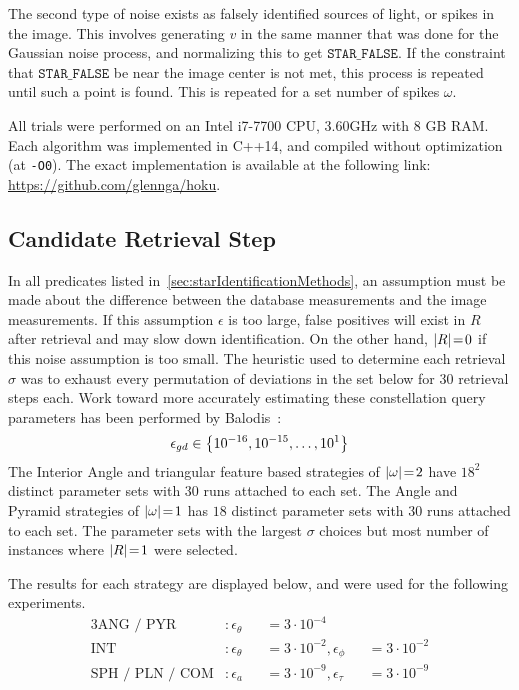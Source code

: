 The second type of noise exists as falsely identified sources of light, or spikes in the image.
This involves generating $v$ in the same manner that was done for the Gaussian noise process, and normalizing this to get $\texttt{STAR\_FALSE}$.
If the constraint that $\texttt{STAR\_FALSE}$ be near the image center is not met, this process is repeated until such a point is found.
This is repeated for a set number of spikes $\omega$.

All trials were performed on an Intel i7-7700 CPU, 3.60GHz with 8 GB RAM\@.
Each algorithm was implemented in C++14, and compiled without optimization (at \texttt{-O0}).
The exact implementation is available at the following link: \url{https://github.com/glennga/hoku}.

\subsection{Candidate Retrieval Step}\label{subsec:catalogQueryStep}
In all predicates listed in~\autoref{sec:starIdentificationMethods}, an assumption must be made about the difference between the database measurements and the image measurements.
If this assumption $\epsilon$ is too large, false positives will exist in $R$ after retrieval and may slow down identification.
On the other hand, $\left| R \right| \!=\! 0$ if this noise assumption is too small.
The heuristic used to determine each retrieval $\sigma$ was to exhaust every permutation of deviations in the set below for 30 retrieval steps each.
Work toward more accurately estimating these constellation query parameters has been performed by Balodis~\cite{balodis:parametersAutomated}:
\begin{equation}
    \epsilon_{gd} \in \left\{  10^{-16}, 10^{-15}, \ldots, 10^1  \right\}
\end{equation}
The Interior Angle and triangular feature based strategies of $\left| \omega \right| \!=\! 2$ have $18^2$ distinct parameter sets with 30 runs attached to each set.
The Angle and Pyramid strategies of $\left| \omega \right| \!=\! 1$ has $18$ distinct parameter sets with 30 runs attached to each set.
The parameter sets with the largest $\sigma$ choices but most number of instances where $\left| R \right| \!=\! 1$ were selected.

The results for each strategy are displayed below, and were used for the following experiments.
\begin{alignat*}{3}
    \text{ANG / PYR}&: \epsilon_\theta &&= 3\cdot 10^{-4} &&{}\\
    \text{INT}&: \epsilon_\theta &&= 3\cdot 10^{-2}, \epsilon_\phi &&= 3\cdot 10^{-2} \\
    \text{SPH / PLN / COM}&: \epsilon_a &&= 3 \cdot 10^{-9}, \epsilon_\tau &&= 3 \cdot 10^{-9}
\end{alignat*}

